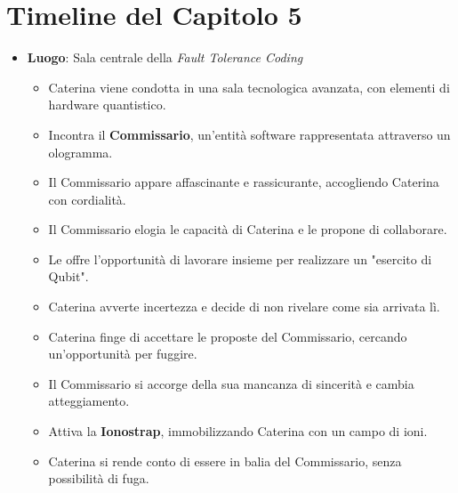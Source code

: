 \section*{Timeline del Capitolo 5}

\begin{itemize}
    \item \textbf{Luogo}: Sala centrale della \emph{Fault Tolerance Coding}
    \begin{itemize}
        \item Caterina viene condotta in una sala tecnologica avanzata, con elementi di hardware quantistico.
        \item Incontra il \textbf{Commissario}, un'entità software rappresentata attraverso un ologramma.
        \item Il Commissario appare affascinante e rassicurante, accogliendo Caterina con cordialità.
    \end{itemize}



\begin{itemize}
    \item Il Commissario elogia le capacità di Caterina e le propone di collaborare.
    \item Le offre l'opportunità di lavorare insieme per realizzare un "esercito di Qubit".
    \item Caterina avverte incertezza e decide di non rivelare come sia arrivata lì.
\end{itemize}


\begin{itemize}
    \item Caterina finge di accettare le proposte del Commissario, cercando un'opportunità per fuggire.
    \item Il Commissario si accorge della sua mancanza di sincerità e cambia atteggiamento.
    \item Attiva la \textbf{Ionostrap}, immobilizzando Caterina con un campo di ioni.
    \item Caterina si rende conto di essere in balia del Commissario, senza possibilità di fuga.
\end{itemize}
\end{itemize}
